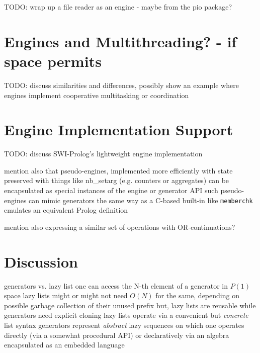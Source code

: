\documentclass{new_tlp}
\begin{document}
{\Large TODO: wrap up a file reader as an engine - maybe from the pio package?}

\section{Engines and Multithreading? - if space permits}

{\Large TODO: discuss similarities and differences, possibly show an example where engines implement cooperative multitasking or coordination}

\section{Engine Implementation Support}

{\Large TODO: discuss  SWI-Prolog's lightweight engine implementation}

\BI
\I mention also that pseudo-engines, implemented more efficiently with state
preserved with things like nb\_setarg (e.g. counters or aggregates) can be encapsulated as special instances of the engine or generator API
\I such pseudo-engines can mimic generators the same way as a C-based built-in like {\tt memberchk} emulates an equivalent Prolog definition 

\I mention also expressing a similar set of operations with OR-continuations?
\EI

\section{Discussion}



\BI
{\Large
\I generators vs. lazy list
\BI
\I one  can access the N-th element of a  generator in $P(1)$ space
\I lazy lists might or might not need $O(N)$ for the same, depending on possible garbage collection of their unused prefix
\I but, lazy lists are reusable while generators need explicit cloning
\I lazy lists operate via a convenient but {\em concrete} list syntax
\I generators represent {\em abstract} lazy sequences on which one operates directly (via a somewhat procedural API) or declaratively via an algebra encapsulated as an embedded language
\EI
}

\end{document}
